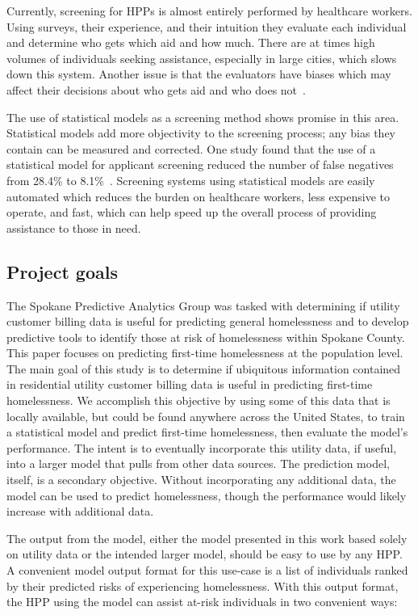 \documentclass[10pt,letterpaper]{article}
\begin{document}
Currently, screening for HPPs is almost entirely performed by healthcare workers. Using surveys, their experience, and their intuition they evaluate each individual and determine who gets which aid and how much. There are at times high volumes of individuals seeking assistance, especially in large cities, which slows down this system. Another issue is that the evaluators have biases which may affect their decisions about who gets aid and who does not~\cite{shinn2019homelessness}.

The use of statistical models as a screening method shows promise in this area. Statistical models add more objectivity to the screening process; any bias they contain can be measured and corrected. One study found that the use of a statistical model for applicant screening reduced the number of false negatives from 28.4\% to 8.1\%~\cite{shinn2019homelessness}. Screening systems using statistical models are easily automated which reduces the burden on healthcare workers, less expensive to operate, and fast, which can help speed up the overall process of providing assistance to those in need.

\subsection*{Project goals}
The Spokane Predictive Analytics Group was tasked with determining if utility customer billing data is useful for predicting general homelessness and to develop predictive tools to identify those at risk of homelessness within Spokane County. This paper focuses on predicting first-time homelessness at the population level. The main goal of this study is to determine if ubiquitous information contained in residential utility customer billing data is useful in predicting first-time homelessness. We accomplish this objective by using some of this data that is locally available, but could be found anywhere across the United States, to train a statistical model and predict first-time homelessness, then evaluate the model's performance. The intent is to eventually incorporate this utility data, if useful, into a larger model that pulls from other data sources. The prediction model, itself, is a secondary objective. Without incorporating any additional data, the model can be used to predict homelessness, though the performance would likely increase with additional data.

The output from the model, either the model presented in this work based solely on utility data or the intended larger model, should be easy to use by any HPP. A convenient model output format for this use-case is a list of individuals ranked by their predicted risks of experiencing homelessness. With this output format, the HPP using the model can assist at-risk individuals in two convenient ways:
\end{document}
